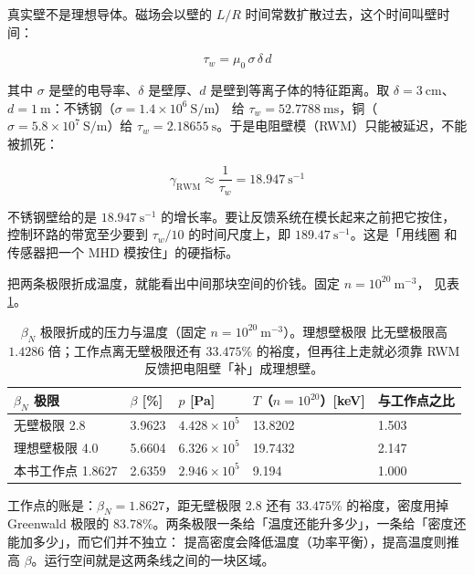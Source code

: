 真实壁不是理想导体。磁场会以壁的 $L/R$ 时间常数扩散过去，这个时间叫壁时间：

\begin{equation}
\tau_w = \mu_0\,\sigma\,\delta\,d
\label{eq:app-v-tauw}
\end{equation}

其中 $\sigma$ 是壁的电导率、$\delta$ 是壁厚、$d$ 是壁到等离子体的特征距离。取
$\delta=3\ \mathrm{cm}$、$d=1\ \mathrm{m}$：不锈钢（$\sigma=1.4\times10^6\ \mathrm{S/m}$）
给 $\tau_w=52.7788\ \mathrm{ms}$，铜（$\sigma=5.8\times10^7\ \mathrm{S/m}$）给
$\tau_w=2.18655\ \mathrm{s}$。于是电阻壁模（RWM）只能被延迟，不能被抓死：

\begin{equation}
\gamma_{\mathrm{RWM}} \approx \frac{1}{\tau_w} = 18.947\ \mathrm{s^{-1}}
\label{eq:app-v-rwm}
\end{equation}

不锈钢壁给的是 $18.947\ \mathrm{s^{-1}}$ 的增长率。要让反馈系统在模长起来之前把它按住，
控制环路的带宽至少要到 $\tau_w/10$ 的时间尺度上，即 $189.47\ \mathrm{s^{-1}}$。这是「用线圈
和传感器把一个 MHD 模按住」的硬指标。

把两条极限折成温度，就能看出中间那块空间的价钱。固定 $n=10^{20}\ \mathrm{m^{-3}}$，
见表 \ref{tab:app-v-beta}。

\begin{table}[htbp]
\centering
\small
\caption{$\beta_N$ 极限折成的压力与温度（固定 $n=10^{20}\ \mathrm{m^{-3}}$）。理想壁极限
比无壁极限高 $1.4286$ 倍；工作点离无壁极限还有 $33.475\%$ 的裕度，但再往上走就必须靠
RWM 反馈把电阻壁「补」成理想壁。}
\label{tab:app-v-beta}
\begin{tabular}{@{}p{2.9cm}p{1.9cm}p{2.3cm}p{2.6cm}p{2.6cm}@{}}
\toprule
$\beta_N$ 极限 & $\beta$ [\%] & $p$ [Pa] & $T$（$n=10^{20}$）[keV] & 与工作点之比 \\
\midrule
无壁极限 2.8 & 3.9623 & $4.428\times10^{5}$ & 13.8202 & 1.503 \\
理想壁极限 4.0 & 5.6604 & $6.326\times10^{5}$ & 19.7432 & 2.147 \\
本书工作点 1.8627 & 2.6359 & $2.946\times10^{5}$ & 9.194 & 1.000 \\
\bottomrule
\end{tabular}

\end{table}

工作点的账是：$\beta_N=1.8627$，距无壁极限 2.8 还有 $33.475\%$ 的裕度，密度用掉 Greenwald
极限的 $83.78\%$。两条极限一条给「温度还能升多少」，一条给「密度还能加多少」，而它们并不独立：
提高密度会降低温度（功率平衡），提高温度则推高 $\beta$。运行空间就是这两条线之间的一块区域。

